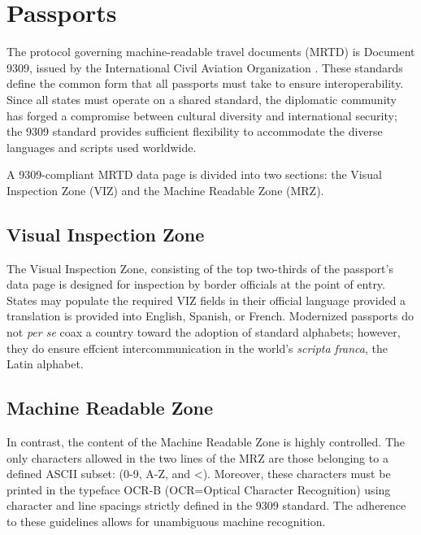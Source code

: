 \section{Passports}

The protocol governing machine-readable travel documents (MRTD) is Document
9309, issued by the International Civil Aviation Organization
\parencite{icao9309}. These standards define the common form that all passports
must take to ensure interoperability. Since all states must operate on a shared
standard, the diplomatic community has forged a compromise between cultural
diversity and international security; the 9309 standard provides sufficient
flexibility to accommodate the diverse languages and scripts used worldwide.

A 9309-compliant MRTD data page is divided into two sections: the Visual
Inspection Zone (VIZ) and the Machine Readable Zone (MRZ).

\subsection{Visual Inspection Zone}

The Visual Inspection Zone, consisting of the top two-thirds of the passport's
data page is designed for inspection by border officials at the point of entry.
States may populate the required VIZ fields in their official language provided
a translation is provided into English, Spanish, or French. Modernized passports
do not \textit{per se} coax a country toward the adoption of standard alphabets;
however, they do ensure effcient intercommunication in the world's
\textit{scripta franca}, the Latin alphabet.

\subsection{Machine Readable Zone}

In contrast, the content of the Machine Readable Zone is highly controlled. The
only characters allowed in the two lines of the MRZ are those belonging to a
defined ASCII subset: (0-9, A-Z, and <). Moreover, these characters must be
printed in the typeface OCR-B (OCR=Optical Character Recognition) using
character and line spacings strictly defined in the 9309 standard. The adherence
to these guidelines allows for unambiguous machine recognition.

